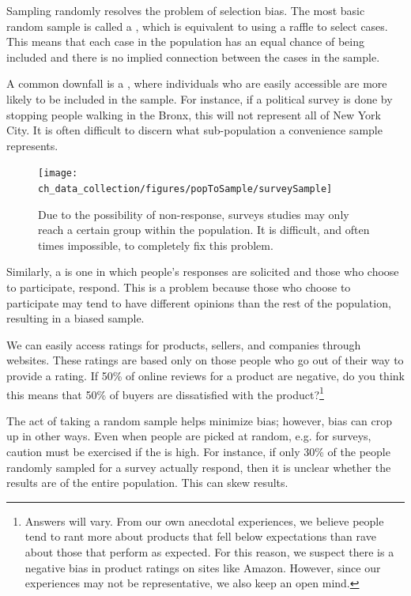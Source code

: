 Sampling randomly resolves the problem of selection bias. The most basic random sample is called a , which is equivalent to using a raffle to select cases. This means that each case in the population has an equal chance of being included and there is no implied connection between the cases in the sample.

A common downfall is a , where individuals who are easily accessible are more likely to be included in the sample. For instance, if a political survey is done by stopping people walking in the Bronx, this will not represent all of New York City. It is often difficult to discern what sub-population a convenience sample represents.

\begin{figure}[h]
\centering
\texttt{[image: ch\_data\_collection/figures/popToSample/surveySample]}
\caption{Due to the possibility of non-response, surveys studies may only reach a certain group within the population. It is difficult, and often times impossible, to completely fix this problem.}
\label{surveySample}
\end{figure}

Similarly, a  is one in which people's responses are solicited and those who choose to participate, respond. This is a problem because those who choose to participate may tend to have different opinions than the rest of the population, resulting in a biased sample.

\begin{exercise}
We can easily access ratings for products, sellers, and companies through websites. These ratings are based only on those people who go out of their way to provide a rating. If 50\% of online reviews for a product are negative, do you think this means that 50\% of buyers are dissatisfied with the product?\footnote{Answers will vary. From our own anecdotal experiences, we believe people tend to rant more about products that fell below expectations than rave about those that perform as expected. For this reason, we suspect there is a negative bias in product ratings on sites like Amazon. However, since our experiences may not be representative, we also keep an open mind.}
\end{exercise}

The act of taking a random sample helps minimize bias; however, bias can crop up in other ways. Even when people are picked at random, e.g. for surveys, caution must be exercised if the   is high. For instance, if only 30\% of the people randomly sampled for a survey actually respond, then it is unclear whether the results are  of the entire population. This   can skew results.

